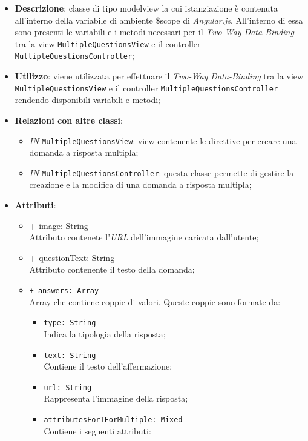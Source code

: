 \begin{itemize}
	\item \textbf{Descrizione}: classe di tipo modelview la cui istanziazione è contenuta all'interno della variabile di ambiente \$scope di \textit{Angular.js}. All'interno di essa sono presenti le variabili e i metodi necessari per il \textit{Two-Way Data-Binding} tra la view \texttt{MultipleQuestionsView} e il controller \texttt{MultipleQuestionsController}; 
	\item \textbf{Utilizzo}: viene utilizzata per effettuare il \textit{Two-Way Data-Binding} tra la view \texttt{MultipleQuestionsView} e il controller \texttt{MultipleQuestionsController} rendendo disponibili variabili e metodi;
	\item \textbf{Relazioni con altre classi}:
	\begin{itemize}
		\item \textit{IN} \texttt{MultipleQuestionsView}: view contenente le direttive per creare una domanda a risposta multipla; 
		\item \textit{IN} \texttt{MultipleQuestionsController}: questa classe permette di gestire la creazione e la modifica di una domanda a risposta multipla;
	\end{itemize}
	\item \textbf{Attributi}:
	\begin{itemize}
		\item {+ image: String} \\ Attributo contenete l'\textit{URL} dell'immagine caricata dall'utente;
		\item {+ questionText: String} \\ Attributo contenente il testo della domanda;
		\item \texttt{+ answers: Array}\\ Array che contiene coppie di valori. Queste coppie sono formate da:
		\begin{itemize}
			\item \texttt{type: String} \\ Indica la tipologia della risposta;
			\item \texttt{text: String} \\ Contiene il testo dell'affermazione;
			\item \texttt{url: String} \\ Rappresenta l'immagine della risposta;
			\item \texttt{attributesForTForMultiple: Mixed} \\ Contiene i seguenti attributi:

\end{itemize}
\end{itemize}
\end{itemize}
